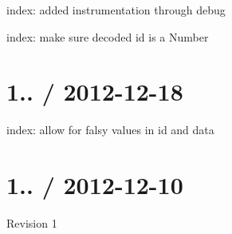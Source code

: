 \begin{DoxyItemize}
\item index\+: added instrumentation through {\ttfamily debug}
\item index\+: make sure decoded {\ttfamily id} is a {\ttfamily Number}
\end{DoxyItemize}

\section*{1.. / 2012-\/12-\/18 }


\begin{DoxyItemize}
\item index\+: allow for falsy values in {\ttfamily id} and {\ttfamily data}
\end{DoxyItemize}

\section*{1.. / 2012-\/12-\/10 }


\begin{DoxyItemize}
\item Revision 1 
\end{DoxyItemize}